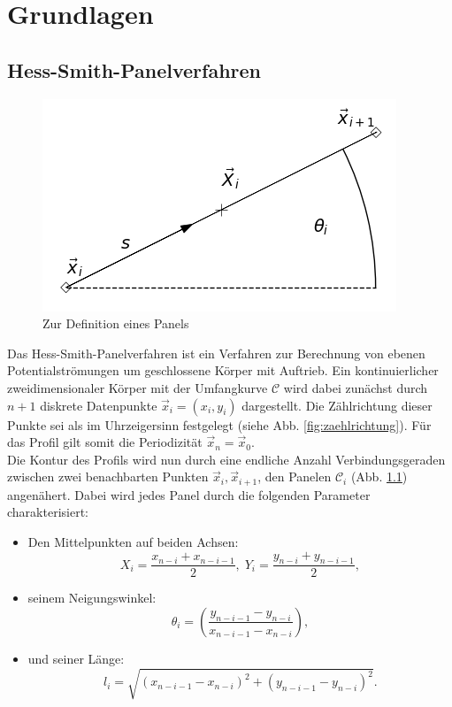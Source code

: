\chapter{Grundlagen}
\label{chap:hess-smith}


\section{Hess-Smith-Panelverfahren}
\begin{figure}[!h]
\begin{center} \includegraphics[scale=0.5]{figures/panel.png} \end{center}
\caption{Zur Definition eines Panels}
\label{fig:panel}
\end{figure}
Das Hess-Smith-Panelverfahren ist ein Verfahren zur Berechnung von ebenen Potentialströmungen um geschlossene Körper mit Auftrieb. Ein kontinuierlicher zweidimensionaler Körper mit der Umfangkurve $\mathcal{C}$ wird dabei zunächst durch  $n + 1$ diskrete Datenpunkte $\vec x_i = (x_i, y_i)$ dargestellt. Die Zählrichtung dieser Punkte sei als im Uhrzeigersinn festgelegt (siehe Abb. \ref{fig:zaehlrichtung}). Für das Profil gilt somit die Periodizität $\vec x_n = \vec x_0$.\\
Die Kontur des Profils wird nun durch eine endliche Anzahl Verbindungsgeraden zwischen zwei benachbarten Punkten $\vec x_i, \vec x_{i+1}$, den Panelen $\mathcal{C}_i$ (Abb. \ref{fig:panel}) angenähert. Dabei wird jedes Panel durch die folgenden Parameter charakterisiert:
\begin{itemize}
\item Den Mittelpunkten auf beiden Achsen: 
\begin{equation}
\label{eq:X}
X_i =  \frac{x_{n-i}+x_{n-i-1}}{2}, \; Y_i =  \frac{y_{n-i}+y_{n-i-1}}{2},
\end{equation}
\item seinem Neigungswinkel: 
\begin{equation}
\theta_i =  \left( \frac{y_{n-i-1} - y_{n-i}}{x_{n-i-1} - x_{n-i}} \right),
\end{equation}
\item und seiner Länge: 
\begin{equation}
\label{eq:l}
l_i =  \sqrt{(x_{n-i-1} - x_{n-i})^2 + (y_{n-i-1} - y_{n-i})^2}.
\end{equation}
\end{itemize}



